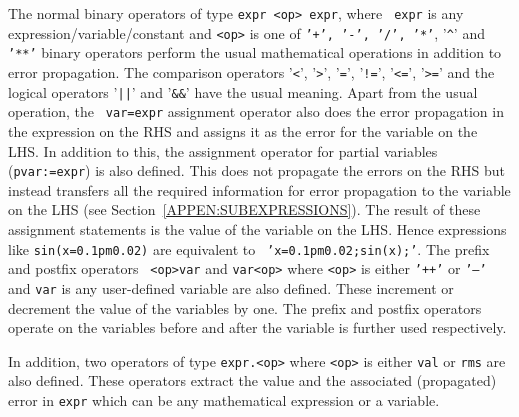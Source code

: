 \documentclass[11pt]{article}
\begin{document}
The normal binary operators of type {\tt expr <op> expr}, where {\tt
expr} is any expression/variable/constant and {\tt <op>} is one of
{\tt '+', '-', '/', '*'}, '{\texttt{\^}}' and {\tt '**'} binary
operators perform the usual mathematical operations in addition to
error propagation.  The comparison operators '{\texttt{<}}',
'{\texttt{>}}', '{\texttt{=}}', '{\texttt{!}}{\texttt{=}}',
'{\texttt{<}}{\texttt{=}}', '{\texttt{>}}{\texttt{=}}' and the logical
operators '{\texttt{|}}{\texttt{|}}' and '{\texttt{\&}}{\texttt{\&}}'
have the usual meaning.  Apart from the usual operation, the {\tt
var=expr} assignment operator also does the error propagation in the
expression on the RHS and assigns it as the error for the variable on
the LHS.  In addition to this, the assignment operator for partial
variables ({\tt pvar:=expr}) is also defined.  This does not propagate
the errors on the RHS but instead transfers all the required
information for error propagation to the variable on the LHS (see
Section~\ref{APPEN:SUBEXPRESSIONS}).  The result of these assignment
statements is the value of the variable on the LHS.  Hence expressions
like {\tt sin(x=0.1pm0.02)} are equivalent to {\tt
'x=0.1pm0.02;sin(x);'}.  The prefix and postfix operators {\tt
<op>var} and {\tt var<op>} where {\tt <op>} is either {\tt '++'} or
{\tt '--'} and {\tt var} is any user-defined variable are also
defined.  These increment or decrement the value of the variables by
one.  The prefix and postfix operators operate on the variables before
and after the variable is further used respectively.

In addition, two operators of type {\tt expr.<op>} where {\tt <op>} is
either {\tt val} or {\tt rms} are also defined.  These operators
extract the value and the associated (propagated) error in {\tt expr}
which can be any mathematical expression or a variable.
\end{document}
